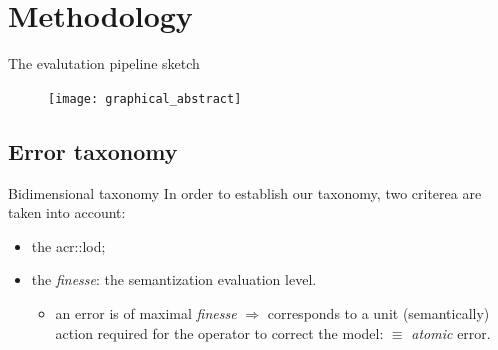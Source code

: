 \documentclass[export]{beamer}
\begin{document}
    \section{Methodology}
        \begin{frame}{The evalutation pipeline sketch}
            \begin{figure}
                \texttt{[image: graphical\_abstract]}
            \end{figure}
        \end{frame}

        \subsection{Error taxonomy}
            \begin{frame}{Bidimensional taxonomy}
                In order to establish our taxonomy, two criterea are taken into account:
                \begin{itemize}[label=$\blacktriangleright$, font=\color{IGNGreen}]
                    \item<1-> the \acrshort{acr::lod};
                    \item<2-> the \emph{finesse}: the semantization evaluation level.
                    \begin{itemize}
                        \item<3-> an error is of maximal \emph{finesse} $\Rightarrow$ corresponds to a unit (semantically) action required for the operator to correct the model: $\equiv$ \emph{atomic} error.
                    \end{itemize}
                \end{itemize}
            \end{frame}
\end{document}
